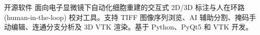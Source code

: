 
\prefix{}
\begin{rubric}{开源软件}
{面向电子显微镜下自动化细胞重建的交互式 2D/3D 标注与人在环路 (human-in-the-loop) 校对工具。支持 TIFF 图像序列浏览、AI 辅助分割、掩码手动编辑、连通分支分析及 3D VTK 渲染。基于 Python、PyQt5 和 VTK 开发。}
\end{rubric}
